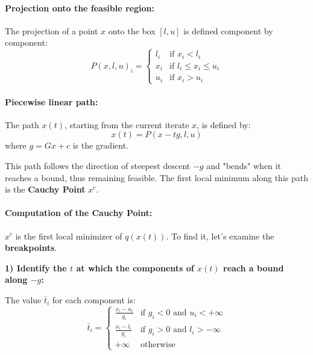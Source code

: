 \paragraph{Projection onto the feasible region:}
The projection of a point $x$ onto the box $[l, u]$ is defined component by component:
\begin{equation}
    P(x, l, u)_i = \begin{cases}
        l_i & \text{if } x_i < l_i \\
        x_i & \text{if } l_i \le x_i \le u_i \\
        u_i & \text{if } x_i > u_i
    \end{cases}
\end{equation}

\paragraph{Piecewise linear path:}
The path $x(t)$, starting from the current iterate $x$, is defined by:
\begin{equation}
    x(t) = P(x - tg, l, u)
\end{equation}
where $g = Gx + c$ is the gradient.

This path follows the direction of steepest descent $-g$ and "bends" when it reaches a bound, thus remaining feasible. The first local minimum along this path is the \textbf{Cauchy Point} $x^c$.

\paragraph{Computation of the Cauchy Point:}
$x^c$ is the first local minimizer of $q(x(t))$. To find it, let's examine the \textbf{breakpoints}.

\textbf{1) Identify the $t$ at which the components of $x(t)$ reach a bound along $-g$:}

The value $\bar{t}_i$ for each component is:
\begin{equation}
    \bar{t}_i = \begin{cases}
        \displaystyle\frac{x_i - u_i}{g_i} & \text{if } g_i < 0 \text{ and } u_i < +\infty \\[10pt]
        \displaystyle\frac{x_i - l_i}{g_i} & \text{if } g_i > 0 \text{ and } l_i > -\infty \\[10pt]
        +\infty & \text{otherwise}
    \end{cases}
\end{equation}

